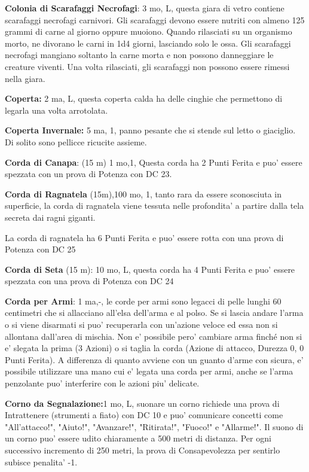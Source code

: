 \documentclass[a4paper,11pt,twoside,openany]{book}
\begin{document}
{\textbf{Colonia di Scarafaggi Necrofagi}: 3 mo, L, questa giara di vetro contiene scarafaggi necrofagi carnivori. Gli scarafaggi devono essere nutriti con almeno 125 grammi di carne al giorno oppure muoiono. Quando rilasciati su un organismo morto, ne divorano le carni in 1d4 giorni, lasciando solo le ossa. Gli scarafaggi necrofagi mangiano soltanto la carne morta e non possono danneggiare le creature viventi. Una volta rilasciati, gli scarafaggi non possono essere rimessi nella giara.

\textbf{Coperta:} 2 ma, L, questa coperta calda ha delle cinghie che permettono di legarla una volta arrotolata.

\textbf{Coperta Invernale:} 5 ma, 1, panno pesante che si stende sul letto o giaciglio. Di solito sono pellicce ricucite assieme.

\textbf{Corda di Canapa}: (15 m) 1 mo,1, Questa corda ha 2 Punti Ferita e puo' essere spezzata con un prova di Potenza con DC 23.

\textbf{Corda di Ragnatela} (15m),100 mo, 1, tanto rara da essere sconosciuta in superficie, la corda di ragnatela viene tessuta nelle profondita’ a partire dalla tela secreta dai ragni giganti.

La corda di ragnatela ha 6 Punti Ferita e puo' essere rotta con una prova di Potenza con DC 25

\textbf{Corda di Seta} (15 m): 10 mo, L, questa corda ha 4 Punti Ferita e puo' essere spezzata con una prova di Potenza con DC 24

\textbf{Corda per Armi}: 1 ma,-, le corde per armi sono legacci di pelle lunghi 60 centimetri che si allacciano all’elsa dell’arma e al polso. Se si lascia andare l’arma o si viene disarmati si puo' recuperarla con un’azione veloce ed essa non si allontana dall’area di mischia. Non e' possibile pero' cambiare arma finché non si e' slegata la prima (3 Azioni) o si taglia la corda (Azione di attacco, Durezza 0, 0 Punti Ferita). A differenza di quanto avviene con un guanto d’arme con sicura, e' possibile utilizzare una mano cui e' legata una corda per armi, anche se l’arma penzolante puo' interferire con le azioni piu' delicate.

\textbf{Corno da Segnalazione:}1 mo, L, suonare un corno richiede una prova di Intrattenere (strumenti a fiato) con DC 10 e puo' comunicare concetti come "All'attacco!", "Aiuto!", "Avanzare!", "Ritirata!", "Fuoco!" e "Allarme!". Il suono di un corno puo' essere udito chiaramente a 500 metri di distanza. Per ogni successivo incremento di 250 metri, la prova di Consapevolezza per sentirlo subisce penalita' -1.

}
\end{document}
